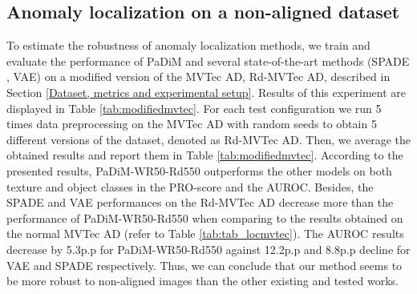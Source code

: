 \documentclass[a4paper,conference]{IEEEtran}
\begin{document}
\subsection{Anomaly localization on a  non-aligned dataset}
\label{PaDiM on non-aligned dataset}
To estimate the robustness of anomaly localization methods, we train and evaluate the performance of PaDiM and several state-of-the-art methods (SPADE \cite{cohen2020subimage}, VAE) on a modified version of the MVTec AD, Rd-MVTec AD, described in Section \ref{Dataset, metrics and experimental setup}.
Results of this experiment are displayed in Table \ref{tab:modifiedmvtec}. 
For each test configuration we run 5 times data preprocessing on the MVTec AD with random seeds to obtain 5 different versions of the dataset, denoted as Rd-MVTec AD. Then, we average the obtained results and report them in Table \ref{tab:modifiedmvtec}.
According to the presented results, PaDiM-WR50-Rd550 outperforms the other models on both texture and object classes in the PRO-score and the AUROC. Besides, the SPADE \cite{cohen2020subimage} and VAE performances on the Rd-MVTec AD decrease more than the performance of PaDiM-WR50-Rd550 when comparing to the results obtained on the normal MVTec AD (refer to Table \ref{tab:tab_locmvtec}). The AUROC results decrease by 5.3p.p for PaDiM-WR50-Rd550 against 12.2p.p and 8.8p.p decline for VAE and SPADE respectively. Thus, we can conclude that our method seems to be more robust to non-aligned images than the other existing and tested works. 
\begin{table}[H]
\centering
\caption{Anomaly localization results on the non-aligned Rd-MVTec AD. Results are displayed as tuples (AUROC\%, PRO-score\%)}

\label{tab:modifiedmvtec}
\end{table}
\end{document}
